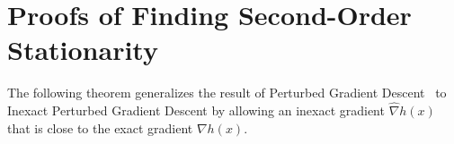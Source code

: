 


\section{Proofs of Finding Second-Order Stationarity} \label{apx:2nd}

The following theorem generalizes the result of Perturbed Gradient Descent~\citep{jin2017escape}
to Inexact Perturbed Gradient Descent by
allowing an inexact gradient $\hat \nabla h(x)$ that is close to the exact gradient $\nabla h(x)$.

